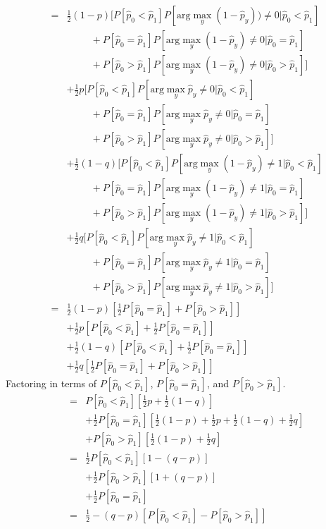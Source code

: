 \documentclass{article}
\begin{document}
\begin{eqnarray}
 &=& \frac{1}{2}(1-p)[ P[\hat{p}_0<\hat{p}_1] P[\textrm{arg} \max_y (1-\hat{p}_y) ) \neq 0|\hat{p}_0<\hat{p}_1] 
\\&&\ \ \ \ \ \ \ \ \ \ \ +P[\hat{p}_0=\hat{p}_1] P[\textrm{arg} \max_y (1-\hat{p}_y ) \neq 0|\hat{p}_0=\hat{p}_1]
\\&&\ \ \ \ \ \ \ \ \ \ \ +P[\hat{p}_0>\hat{p}_1] P[\textrm{arg} \max_y (1-\hat{p}_y ) \neq 0|\hat{p}_0>\hat{p}_1] ]
\\&& +\frac{1}{2}p [ P[\hat{p}_0<\hat{p}_1] P[\textrm{arg} \max_y \hat{p}_y \neq 0|\hat{p}_0<\hat{p}_1] 
\\&&\ \ \ \ \ \ \ \ \ \ \ +P[\hat{p}_0=\hat{p}_1] P[\textrm{arg} \max_y \hat{p}_y \neq 0|\hat{p}_0=\hat{p}_1]
\\&&\ \ \ \ \ \ \ \ \ \ \ +P[\hat{p}_0>\hat{p}_1] P[\textrm{arg} \max_y \hat{p}_y \neq 0|\hat{p}_0>\hat{p}_1] ]
\\&& + \frac{1}{2}(1-q)[ P[\hat{p}_0<\hat{p}_1] P[\textrm{arg} \max_y (1- \hat{p}_y ) \neq 1|\hat{p}_0<\hat{p}_1] 
\\&&\ \ \ \ \ \ \ \ \ \ \ +P[\hat{p}_0=\hat{p}_1] P[\textrm{arg} \max_y (1-\hat{p}_y ) \neq 1|\hat{p}_0=\hat{p}_1]
\\&&\ \ \ \ \ \ \ \ \ \ \ +P[\hat{p}_0>\hat{p}_1] P[\textrm{arg} \max_y (1- \hat{p}_y ) \neq 1|\hat{p}_0>\hat{p}_1] ]
\\&& +\frac{1}{2}q [ P[\hat{p}_0<\hat{p}_1] P[\textrm{arg} \max_y \hat{p}_y \neq 1|\hat{p}_0<\hat{p}_1] 
\\&&\ \ \ \ \ \ \ \ \ \ \ +P[\hat{p}_0=\hat{p}_1] P[\textrm{arg} \max_y \hat{p}_y \neq 1|\hat{p}_0=\hat{p}_1]
\\&&\ \ \ \ \ \ \ \ \ \ \ +P[\hat{p}_0>\hat{p}_1] P[\textrm{arg} \max_y \hat{p}_y \neq 1|\hat{p}_0>\hat{p}_1] ]
\\
 &=& \frac{1}{2}(1-p)[\frac{1}{2} P[\hat{p}_0=\hat{p}_1] +P[\hat{p}_0>\hat{p}_1] ]
\\&& +\frac{1}{2}p [ P[\hat{p}_0<\hat{p}_1] + \frac{1}{2}P[\hat{p}_0=\hat{p}_1]]
\\&& + \frac{1}{2}(1-q)[ P[\hat{p}_0<\hat{p}_1] +\frac{1}{2}P[\hat{p}_0=\hat{p}_1]]
\\&& +\frac{1}{2}q [\frac{1}{2}P[\hat{p}_0=\hat{p}_1] +P[\hat{p}_0>\hat{p}_1] ]
\end{eqnarray}
Factoring in terms of $P[\hat{p}_0<\hat{p}_1]$, $P[\hat{p}_0=\hat{p}_1]$, and $P[\hat{p}_0>\hat{p}_1]$.
\begin{eqnarray}
&=& P[\hat{p}_0<\hat{p}_1] [\frac{1}{2}p +\frac{1}{2}(1-q)]
\\&& + \frac{1}{2} P[\hat{p}_0=\hat{p}_1] [\frac{1}{2}(1-p) +\frac{1}{2}p +\frac{1}{2}(1-q) +\frac{1}{2}q]
\\&& + P[\hat{p}_0>\hat{p}_1] [\frac{1}{2}(1-p) +\frac{1}{2}q]
\\
&=& \frac{1}{2} P[\hat{p}_0<\hat{p}_1] [1-(q-p)]
\\&& +\frac{1}{2} P[\hat{p}_0>\hat{p}_1] [1+(q-p)]
\\&& +\frac{1}{2} P[\hat{p}_0=\hat{p}_1]
\\
&=& \frac{1}{2} - (q-p)[P[\hat{p}_0<\hat{p}_1] - P[\hat{p}_0>\hat{p}_1]]
\end{eqnarray}
\end{document}
